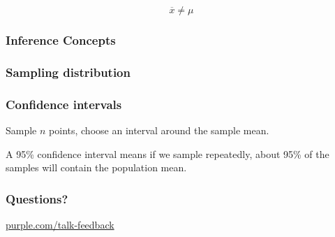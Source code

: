 \begin{frame}
  \begin{displaymath}
    \overline{x}\ne\mu
  \end{displaymath}
\end{frame}

\begin{frame}
  \frametitle{Inference Concepts}




\end{frame}

\begin{frame}
  \frametitle{Sampling distribution}

\end{frame}

\begin{frame}
  \frametitle{Confidence intervals}

  Sample $n$ points, choose an interval around the sample mean.

  A 95\% confidence interval means if we sample repeatedly, about 95\%
  of the samples will contain the population mean.


\end{frame}



\begin{frame}
  \frametitle{Questions?}
  \centerline{\large\url{purple.com/talk-feedback}}
\end{frame}


